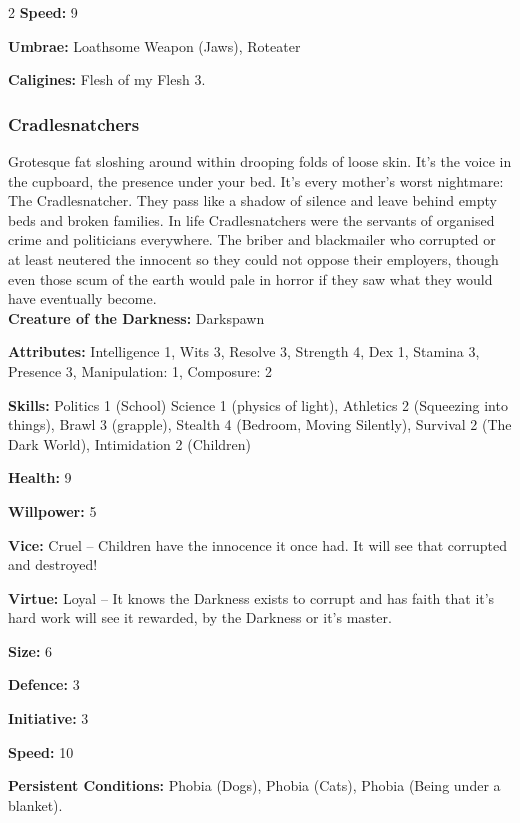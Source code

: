 \begin{multicols}{2}
\noindent \textbf{Speed:} 9

\noindent \textbf{Umbrae:} Loathsome Weapon (Jaws), Roteater

\noindent \textbf{Caligines:} Flesh of my Flesh 3.

\subsubsection*{Cradlesnatchers}

Grotesque fat sloshing around within drooping folds of loose skin. It's the voice in the cupboard, the presence under your bed. It's every mother's worst nightmare: The Cradlesnatcher. They pass like a shadow of silence and leave behind empty beds and broken families. In life Cradlesnatchers were the servants of organised crime and politicians everywhere. The briber and blackmailer who corrupted or at least neutered the innocent so they could not oppose their employers, though even those scum of the earth would pale in horror if they saw what they would have eventually become.\\

\noindent \textbf{Creature of the Darkness:} Darkspawn

\noindent \textbf{Attributes:} Intelligence 1, Wits 3, Resolve 3, Strength 4, Dex 1, Stamina 3, Presence 3, Manipulation: 1, Composure: 2

\noindent \textbf{Skills:} Politics 1 (School) Science 1 (physics of light), Athletics 2 (Squeezing into things), Brawl 3 (grapple), Stealth 4 (Bedroom, Moving Silently), Survival 2 (The Dark World), Intimidation 2 (Children)

\noindent \textbf{Health:} 9

\noindent \textbf{Willpower:} 5

\noindent \textbf{Vice:} Cruel – Children have the innocence it once had. It will see that corrupted and destroyed!

\noindent \textbf{Virtue:} Loyal – It knows the Darkness exists to corrupt and has faith that it's hard work will see it rewarded, by the Darkness or it's master.

\noindent \textbf{Size:} 6

\noindent \textbf{Defence:} 3

\noindent \textbf{Initiative:} 3

\noindent \textbf{Speed:} 10

\noindent \textbf{Persistent Conditions:} Phobia (Dogs), Phobia (Cats), Phobia (Being under a blanket).


\end{multicols}
